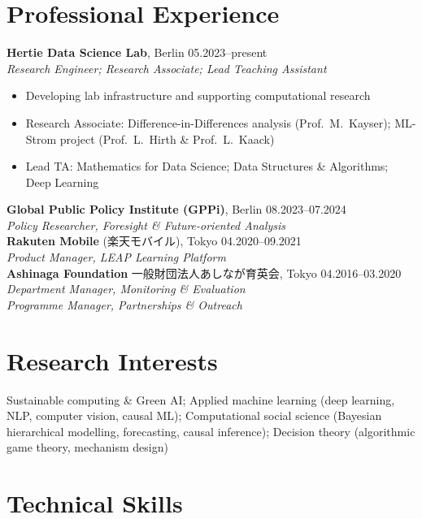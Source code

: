 \documentclass[11pt,a4paper]{article}
\newcommand{\jp}[1]{{\japanesefont #1}}
\begin{document}
\section*{Professional Experience}

\noindent\textbf{Hertie Data Science Lab}, Berlin \hfill 05.2023--present\\
\textit{Research Engineer; Research Associate; Lead Teaching Assistant}
\begin{itemize}
    \item Developing lab infrastructure and supporting computational research
    \item Research Associate: Difference-in-Differences analysis (Prof.\ M.\ Kayser); ML-Strom project (Prof.\ L.\ Hirth \& Prof.\ L.\ Kaack)
    \item Lead TA: Mathematics for Data Science; Data Structures \& Algorithms; Deep Learning
\end{itemize}

\vspace{0.5em}
\noindent\textbf{Global Public Policy Institute (GPPi)}, Berlin \hfill 08.2023--07.2024\\
\textit{Policy Researcher, Foresight \& Future-oriented Analysis}\\[0.8em]

\noindent\textbf{Rakuten Mobile} \jp{(楽天モバイル)}, Tokyo \hfill 04.2020--09.2021\\
\textit{Product Manager, LEAP Learning Platform}\\[0.8em]

\noindent\textbf{Ashinaga Foundation} \jp{一般財団法人あしなが育英会}, Tokyo \hfill 04.2016--03.2020\\
\textit{Department Manager, Monitoring \& Evaluation}\\
\textit{Programme Manager, Partnerships \& Outreach}

\section*{Research Interests}

Sustainable computing \& Green AI; Applied machine learning (deep learning, NLP, computer vision, causal ML); Computational social science (Bayesian hierarchical modelling, forecasting, causal inference); Decision theory (algorithmic game theory, mechanism design)

\section*{Technical Skills}
\end{document}
